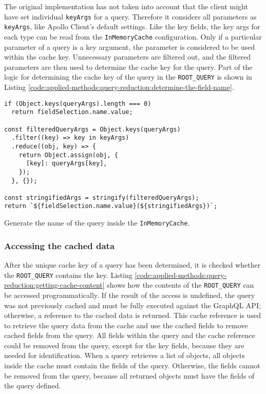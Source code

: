 \bigskip

\noindent The original implementation has not taken into account that the client might have set individual \texttt{keyArgs} for a query. Therefore it considers all parameters as \texttt{keyArgs}, like Apollo Client's default settings. Like the key fields, the key args for each type can be read from the \texttt{InMemoryCache} configuration. Only if a particular parameter of a query is a key argument, the parameter is considered to be used within the cache key. Unnecessary parameters are filtered out, and the filtered parameters are then used to determine the cache key for the query. Part of the logic for determining the cache key of the query in the \texttt{ROOT\_QUERY} is shown in Listing \ref{code:applied-methods:query-reduction:determine-the-field-name}.

\ifshowListings
\begin{listing}[H]
\begin{verbatim}
if (Object.keys(queryArgs).length === 0)
  return fieldSelection.name.value;

const filteredQueryArgs = Object.keys(queryArgs)
  .filter((key) => key in keyArgs)
  .reduce((obj, key) => {
    return Object.assign(obj, {
      [key]: queryArgs[key],
    });
  }, {});

const stringifiedArgs = stringify(filteredQueryArgs);
return `${fieldSelection.name.value}(${stringifiedArgs})`;
\end{verbatim}
\caption{Generate the name of the query inside the \texttt{InMemoryCache}.}\label{code:applied-methods:query-reduction:determine-the-field-name}
\end{listing}
\fi

\subsubsection{Accessing the cached data}

\noindent After the unique cache key of a query has been determined, it is checked whether the \texttt{ROOT\_QUERY} contains the key. Listing \ref{code:applied-methods:query-reduction:getting-cache-content} shows how the contents of the \texttt{ROOT\_QUERY} can be accessed programmatically. If the result of the access is undefined, the query was not previously cached and must be fully executed against the GraphQL \ac{API}; otherwise, a reference to the cached data is returned. This cache reference is used to retrieve the query data from the cache and use the cached fields to remove cached fields from the query. All fields within the query and the cache reference could be removed from the query, except for the key fields, because they are needed for identification. When a query retrieves a list of objects, all objects inside the cache must contain the fields of the query. Otherwise, the fields cannot be removed from the query, because all returned objects must have the fields of the query defined.


